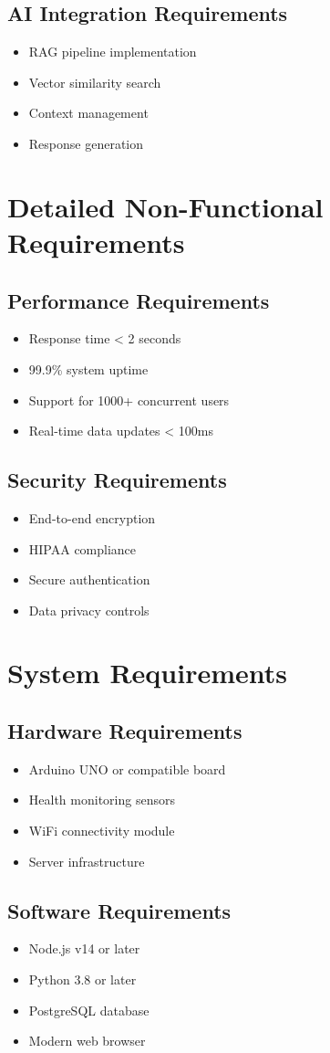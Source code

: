 \subsection{AI Integration Requirements}
\begin{itemize}
    \item RAG pipeline implementation
    \item Vector similarity search
    \item Context management
    \item Response generation
\end{itemize}

\section{Detailed Non-Functional Requirements}
\subsection{Performance Requirements}
\begin{itemize}
    \item Response time < 2 seconds
    \item 99.9\% system uptime
    \item Support for 1000+ concurrent users
    \item Real-time data updates < 100ms
\end{itemize}

\subsection{Security Requirements}
\begin{itemize}
    \item End-to-end encryption
    \item HIPAA compliance
    \item Secure authentication
    \item Data privacy controls
\end{itemize}

\section{System Requirements}
\subsection{Hardware Requirements}
\begin{itemize}
    \item Arduino UNO or compatible board
    \item Health monitoring sensors
    \item WiFi connectivity module
    \item Server infrastructure
\end{itemize}

\subsection{Software Requirements}
\begin{itemize}
    \item Node.js v14 or later
    \item Python 3.8 or later
    \item PostgreSQL database
    \item Modern web browser
\end{itemize} 